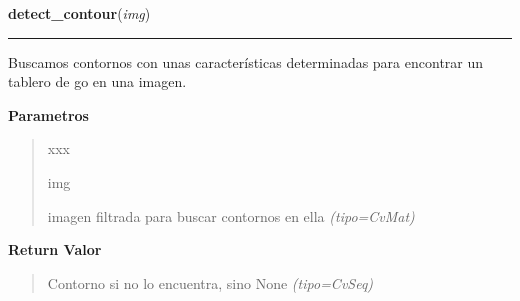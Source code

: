 \hspace{.8\funcindent}\begin{boxedminipage}{\funcwidth}

    \raggedright \textbf{detect\_contour}(\textit{img})

    \vspace{-1.5ex}

    \rule{\textwidth}{0.5\fboxrule}
\setlength{\parskip}{2ex}
Buscamos contornos con unas características determinadas para encontrar un tablero de go en una imagen.

\setlength{\parskip}{1ex}
      \textbf{Parametros}
      \vspace{-1ex}

      \begin{quote}
        \begin{Ventry}{xxx}

          \item[img]


imagen filtrada para buscar contornos en ella
            {\it (tipo=CvMat)}

        \end{Ventry}

      \end{quote}

      \textbf{Return Valor}
    \vspace{-1ex}

      \begin{quote}

Contorno si no lo encuentra, sino None
      {\it (tipo=CvSeq)}

      \end{quote}

    \end{boxedminipage}

    \label{src:search_goban:search_goban}

    \vspace{0.5ex}

